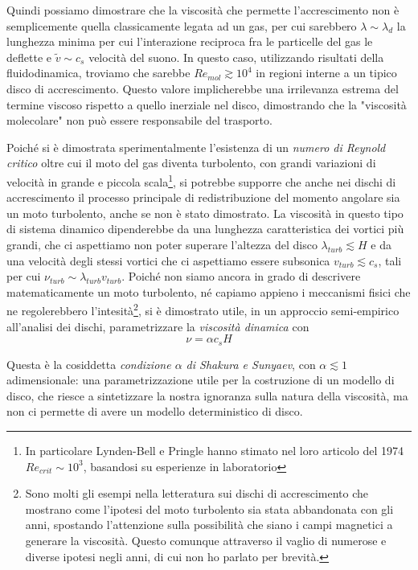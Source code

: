 \documentclass[a4paperbi]{article}
\begin{document}
	Quindi possiamo dimostrare che la viscosità che permette l'accrescimento non è semplicemente quella classicamente legata ad un gas, per cui sarebbero $\lambda\sim\lambda_d$ la lunghezza minima per cui l'interazione reciproca fra le particelle del gas le deflette e $\tilde{v}\sim c_s$ velocità del suono. In questo caso, utilizzando risultati della fluidodinamica, troviamo che sarebbe $Re_{mol}\gtrsim10^4$ in regioni interne a un tipico disco di accrescimento. Questo valore implicherebbe una irrilevanza estrema del termine viscoso rispetto a quello inerziale nel disco, dimostrando che la "viscosità molecolare" non può essere responsabile del trasporto.
	
	Poiché si è dimostrata sperimentalmente l'esistenza di un \textit{numero di Reynold critico} oltre cui il moto del gas diventa turbolento, con grandi variazioni di velocità in grande e piccola scala\footnote{In particolare Lynden-Bell e Pringle hanno stimato nel loro articolo del 1974 $Re_{crit}\sim 10^3$, basandosi su esperienze in laboratorio}, si potrebbe supporre che anche nei dischi di accrescimento il processo principale di redistribuzione del momento angolare sia un moto turbolento, anche se non è stato dimostrato.
	La viscosità in questo tipo di sistema dinamico dipenderebbe da una lunghezza caratteristica dei vortici più grandi, che ci aspettiamo non poter superare l'altezza del disco $\lambda_{turb}\lesssim H$ e da una velocità degli stessi vortici che ci aspettiamo essere subsonica $v_{turb}\lesssim c_s$, tali per cui $\nu_{turb}\sim \lambda_{turb}v_{turb}$.
	Poiché non siamo ancora in grado di descrivere matematicamente un moto turbolento, né capiamo appieno i meccanismi fisici che ne regolerebbero l'intesità\footnote{Sono molti gli esempi nella letteratura sui dischi di accrescimento che mostrano come l'ipotesi del moto turbolento sia stata abbandonata con gli anni, spostando l'attenzione sulla possibilità che siano i campi magnetici a generare la viscosità. Questo comunque attraverso il vaglio di numerose e diverse ipotesi negli anni, di cui non ho parlato per brevità.}, si è dimostrato utile, in un approccio semi-empirico all'analisi dei dischi, parametrizzare la \textit{viscosità dinamica} con
	\begin{equation}
		\nu=\alpha c_s H
	\end{equation}
	
	Questa è la cosiddetta \textit{condizione $\alpha$ di Shakura e Sunyaev}, con $\alpha\lesssim 1$ adimensionale: una parametrizzazione utile per la costruzione di un modello di disco, che riesce a sintetizzare la nostra ignoranza sulla natura della viscosità, ma non ci permette di avere un modello deterministico di disco.
	
\end{document}
